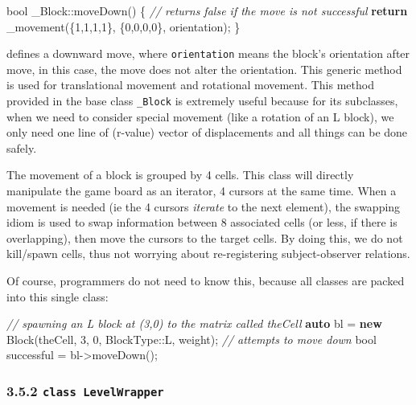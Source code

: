 \documentclass[
]{article}
\newenvironment{Shaded}{}{}
\newcommand{\CommentTok}[1]{\textcolor[rgb]{0.38,0.63,0.69}{\textit{#1}}}
\newcommand{\ControlFlowTok}[1]{\textcolor[rgb]{0.00,0.44,0.13}{\textbf{#1}}}
\newcommand{\DataTypeTok}[1]{\textcolor[rgb]{0.56,0.13,0.00}{#1}}
\newcommand{\DecValTok}[1]{\textcolor[rgb]{0.25,0.63,0.44}{#1}}
\newcommand{\KeywordTok}[1]{\textcolor[rgb]{0.00,0.44,0.13}{\textbf{#1}}}
\newcommand{\NormalTok}[1]{#1}
\begin{document}
\begin{Shaded}
\begin{Highlighting}[]
\DataTypeTok{bool}\NormalTok{ _Block::moveDown() \{}
     \CommentTok{// returns false if the move is not successful}
    \ControlFlowTok{return}\NormalTok{ _movement(\{}\DecValTok{1}\NormalTok{,}\DecValTok{1}\NormalTok{,}\DecValTok{1}\NormalTok{,}\DecValTok{1}\NormalTok{\}, \{}\DecValTok{0}\NormalTok{,}\DecValTok{0}\NormalTok{,}\DecValTok{0}\NormalTok{,}\DecValTok{0}\NormalTok{\}, orientation);}
\NormalTok{\}}
\end{Highlighting}
\end{Shaded}

defines a downward move, where \texttt{orientation} means the block's
orientation after move, in this case, the move does not alter the
orientation. This generic method is used for translational movement and
rotational movement. This method provided in the base class
\texttt{\_Block} is extremely useful because for its subclasses, when we
need to consider special movement (like a rotation of an L block), we
only need one line of (r-value) vector of displacements and all things
can be done safely.

The movement of a block is grouped by 4 cells. This class will directly
manipulate the game board as an iterator, 4 cursors at the same time.
When a movement is needed (ie the 4 cursors \emph{iterate} to the next
element), the swapping idiom is used to swap information between 8
associated cells (or less, if there is overlapping), then move the
cursors to the target cells. By doing this, we do not kill/spawn cells,
thus not worrying about re-registering subject-observer relations.

Of course, programmers do not need to know this, because all classes are
packed into this single class:

\begin{Shaded}
\begin{Highlighting}[]
\CommentTok{// spawning an L block at (3,0) to the matrix called theCell}
\KeywordTok{auto}\NormalTok{ bl = }\KeywordTok{new}\NormalTok{ Block(theCell, }\DecValTok{3}\NormalTok{, }\DecValTok{0}\NormalTok{, BlockType::L, weight);}
\CommentTok{// attempts to move down}
\DataTypeTok{bool}\NormalTok{ successful = bl->moveDown();}
\end{Highlighting}
\end{Shaded}

\hypertarget{class-levelwrapper}{%
\subsubsection{\texorpdfstring{3.5.2
\texttt{class\ LevelWrapper}}{3.5.2 class LevelWrapper}}\label{class-levelwrapper}}
\end{document}
